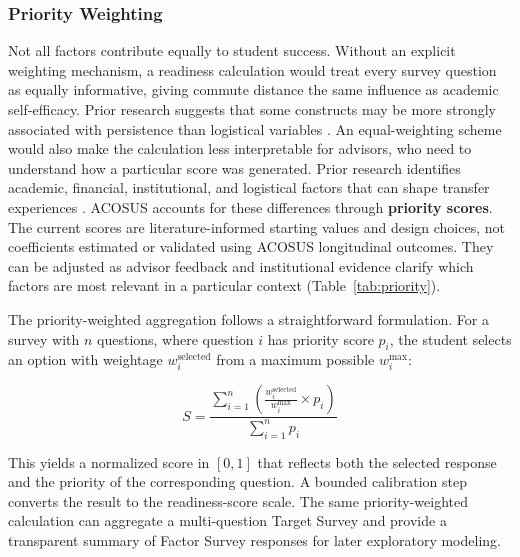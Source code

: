 \documentclass[letterpaper,11pt]{article}
\begin{document}
\subsubsection{Priority Weighting}

Not all factors contribute equally to student success. Without an explicit weighting mechanism, a readiness calculation would treat every survey question as equally informative, giving commute distance the same influence as academic self-efficacy. Prior research suggests that some constructs may be more strongly associated with persistence than logistical variables \parencite{factoranalysis2023}. An equal-weighting scheme would also make the calculation less interpretable for advisors, who need to understand how a particular score was generated. Prior research identifies academic, financial, institutional, and logistical factors that can shape transfer experiences \parencite{factoranalysis2023,computingtransfer2024}. ACOSUS accounts for these differences through \textbf{priority scores}. The current scores are literature-informed starting values and design choices, not coefficients estimated or validated using ACOSUS longitudinal outcomes. They can be adjusted as advisor feedback and institutional evidence clarify which factors are most relevant in a particular context (Table~\ref{tab:priority}).

The priority-weighted aggregation follows a straightforward formulation. For a survey with $n$ questions, where question $i$ has priority score $p_i$, the student selects an option with weightage $w_i^{\text{selected}}$ from a maximum possible $w_i^{\text{max}}$:

\begin{equation}
S = \frac{\sum_{i=1}^{n} \left(\frac{w_i^{\text{selected}}}{w_i^{\text{max}}} \times p_i\right)}{\sum_{i=1}^{n} p_i}
\label{eq:priority}
\end{equation}

This yields a normalized score in $[0, 1]$ that reflects both the selected response and the priority of the corresponding question. A bounded calibration step converts the result to the readiness-score scale. The same priority-weighted calculation can aggregate a multi-question Target Survey and provide a transparent summary of Factor Survey responses for later exploratory modeling.
\end{document}
